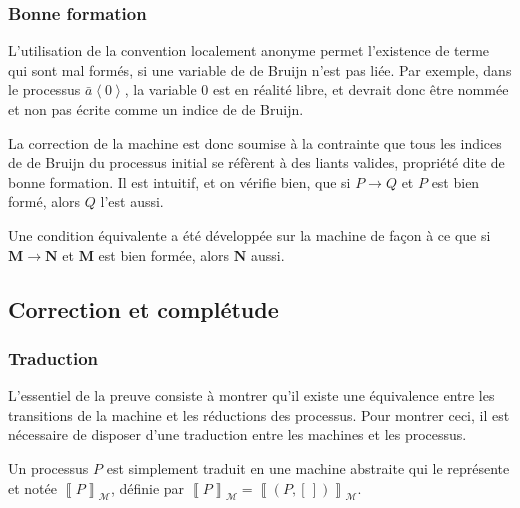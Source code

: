 \documentclass[11pt]{article}
\newcommand{\send}[2]{\bar{#1}\left\langle #2\right\rangle}
\renewcommand{\empty}{\left[\,\right]}
\newcommand{\machine}[1]{\left\llbracket{#1}\right\rrbracket_{\mathcal{M}}}
\begin{document}
\subsubsection{Bonne formation}
\label{sec-3-1-3}

L'utilisation de la convention localement anonyme permet l'existence de terme qui sont mal formés, si une variable de de Bruijn n'est pas liée. Par exemple, dans le processus $\send{a}0$, la variable $0$ est en réalité libre, et devrait donc être nommée et non pas écrite comme un indice de de Bruijn.

La correction de la machine est donc soumise à la contrainte que tous les indices de de Bruijn du processus initial se réfèrent à des liants valides, propriété dite de bonne formation. Il est intuitif, et on vérifie bien, que si $P\to Q$ et $P$ est bien formé, alors $Q$ l'est aussi.

Une condition équivalente a été développée sur la machine de façon à ce que si $\mathbf{M}\to \mathbf{N}$ et $\mathbf{M}$ est bien formée, alors $\mathbf{N}$ aussi.

\subsection{Correction et complétude}
\label{sec-3-2}
\subsubsection{Traduction}
\label{sec-3-2-1}

L'essentiel de la preuve consiste à montrer qu'il existe une équivalence entre les transitions de la machine et les réductions des processus.
Pour montrer ceci, il est nécessaire de disposer d'une traduction entre les machines et les processus.

Un processus $P$ est simplement traduit en une machine abstraite qui le représente et notée $\machine{P}$, définie par
$\machine{P} = \machine{(P,\empty)}$.
\end{document}

